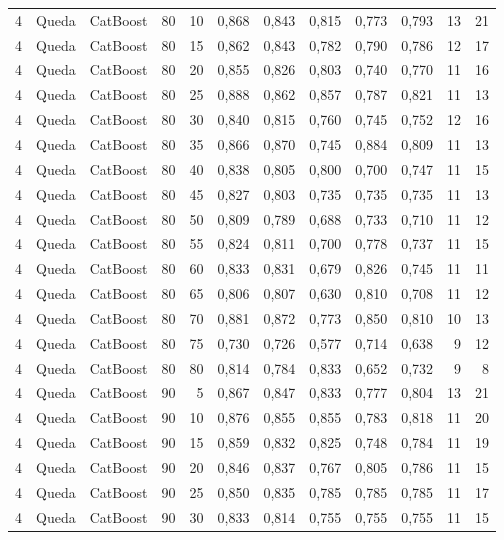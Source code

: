 \begin{longtable}{ccclrrrrrrrr}
4 & Queda & CatBoost & 80 & 10 & 0,868 & 0,843 & 0,815 & 0,773 & 0,793 & 13 & 21 \\
4 & Queda & CatBoost & 80 & 15 & 0,862 & 0,843 & 0,782 & 0,790 & 0,786 & 12 & 17 \\
4 & Queda & CatBoost & 80 & 20 & 0,855 & 0,826 & 0,803 & 0,740 & 0,770 & 11 & 16 \\
4 & Queda & CatBoost & 80 & 25 & 0,888 & 0,862 & 0,857 & 0,787 & 0,821 & 11 & 13 \\
4 & Queda & CatBoost & 80 & 30 & 0,840 & 0,815 & 0,760 & 0,745 & 0,752 & 12 & 16 \\
4 & Queda & CatBoost & 80 & 35 & 0,866 & 0,870 & 0,745 & 0,884 & 0,809 & 11 & 13 \\
4 & Queda & CatBoost & 80 & 40 & 0,838 & 0,805 & 0,800 & 0,700 & 0,747 & 11 & 15 \\
4 & Queda & CatBoost & 80 & 45 & 0,827 & 0,803 & 0,735 & 0,735 & 0,735 & 11 & 13 \\
4 & Queda & CatBoost & 80 & 50 & 0,809 & 0,789 & 0,688 & 0,733 & 0,710 & 11 & 12 \\
4 & Queda & CatBoost & 80 & 55 & 0,824 & 0,811 & 0,700 & 0,778 & 0,737 & 11 & 15 \\
4 & Queda & CatBoost & 80 & 60 & 0,833 & 0,831 & 0,679 & 0,826 & 0,745 & 11 & 11 \\
4 & Queda & CatBoost & 80 & 65 & 0,806 & 0,807 & 0,630 & 0,810 & 0,708 & 11 & 12 \\
4 & Queda & CatBoost & 80 & 70 & 0,881 & 0,872 & 0,773 & 0,850 & 0,810 & 10 & 13 \\
4 & Queda & CatBoost & 80 & 75 & 0,730 & 0,726 & 0,577 & 0,714 & 0,638 & 9 & 12 \\
4 & Queda & CatBoost & 80 & 80 & 0,814 & 0,784 & 0,833 & 0,652 & 0,732 & 9 & 8 \\
4 & Queda & CatBoost & 90 & 5 & 0,867 & 0,847 & 0,833 & 0,777 & 0,804 & 13 & 21 \\
4 & Queda & CatBoost & 90 & 10 & 0,876 & 0,855 & 0,855 & 0,783 & 0,818 & 11 & 20 \\
4 & Queda & CatBoost & 90 & 15 & 0,859 & 0,832 & 0,825 & 0,748 & 0,784 & 11 & 19 \\
4 & Queda & CatBoost & 90 & 20 & 0,846 & 0,837 & 0,767 & 0,805 & 0,786 & 11 & 15 \\
4 & Queda & CatBoost & 90 & 25 & 0,850 & 0,835 & 0,785 & 0,785 & 0,785 & 11 & 17 \\
4 & Queda & CatBoost & 90 & 30 & 0,833 & 0,814 & 0,755 & 0,755 & 0,755 & 11 & 15 \\

\end{longtable}
